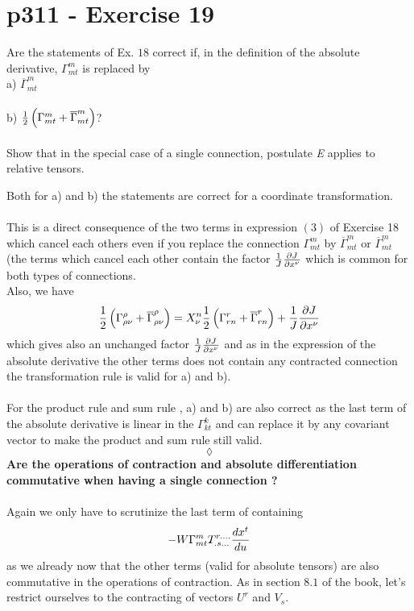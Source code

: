 \section{p311 - Exercise 19}
\begin{tcolorbox}
Are the statements of Ex. $18$ correct if, in the definition of the absolute derivative, $\Gamma^m_{mt}$ is replaced by \\
a) $\overline{\Gamma}^m_{mt}$\\\\
b) $\frac{1}{2}\left(\Gamma^m_{mt}+ \overline{\Gamma}^m_{mt}\right)$?\\\\
Show that in the special case  of a single connection, postulate \textit{E} applies to relative tensors.
\end{tcolorbox}
Both for a) and b) the statements are correct for a coordinate transformation. \\\\
This is a direct consequence of the two terms in expression $(3)$ of Exercise 18 which cancel each others even if you replace the connection $\Gamma^m_{mt}$ by $\overline{\Gamma}^m_{mt}$ or $\overline{\Gamma}^m_{mt}$ (the terms which cancel each other contain the factor $\frac{1}{J}\pdv{J}{x^{\nu}}$ which is common for both types of connections. \\
Also, we have
$$\frac{1}{2}\left(\Gamma^{\rho}_{\rho\nu}+\overline{\Gamma}^{\rho}_{\rho\nu}\right)= X^{n}_{\nu}\frac{1}{2}\left(\Gamma^r_{rn}+\overline{\Gamma}^r_{rn}\right) + \frac{1}{J}\pdv{J}{x^{\nu}}$$ 
which gives also an unchanged factor $\frac{1}{J}\pdv{J}{x^{\nu}}$  and as in the expression of the absolute derivative the other terms does not contain any contracted connection the transformation rule is valid for a) and b).\\\\
For the product rule and sum rule , a) and b) are  also correct as the last term of the absolute derivative is linear in the $\Gamma^k_{kt}$ and can replace it by any covariant vector to make the product and sum rule still valid.
$$\lozenge$$
\textbf{Are the operations of contraction and absolute differentiation commutative when having a single connection ?}\\\\
Again we only have to scrutinize the last term of containing 
$$-W\Gamma^m_{mt}T^{r . \dots}_{.s\dots}\dv{x^t}{u}$$ as we already now that the other terms (valid for absolute tensors) are also commutative in the operations of contraction.
As in section $8.1$ of the book, let's restrict ourselves to the contracting of vectors $U^r$ and $V_s$. 
